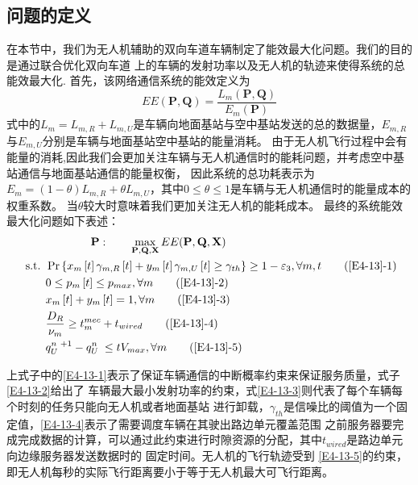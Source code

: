 \subsection{问题的定义}\label{section4-2-3}
在本节中，我们为无人机辅助的双向车道车辆制定了能效最大化问题。我们的目的是通过联合优化双向车道
上的车辆的发射功率以及无人机的轨迹来使得系统的总能效最大化.
首先，该网络通信系统的能效定义为
\begin{equation} \label{E4-12}
EE(\mathbf{P}, \mathbf{Q})=
{\frac{{{L}_{m}}\left( \mathbf{P}, \mathbf{Q} \right)}
{{{E}_{m}}\left( \mathbf{P} \right)}}
\end{equation}
式中的${{L}_{m}={L}_{m,R}+{L}_{m,U}}$是车辆向地面基站与空中基站发送的总的数据量，${E}_{m,R}$与${E}_{m,U}$分别是车辆与地面基站空中基站的能量消耗。
由于无人机飞行过程中会有能量的消耗,因此我们会更加关注车辆与无人机通信时的能耗问题，并考虑空中基站通信与地面基站通信的能量权衡，
因此系统的总功耗表示为${{E}_{m}=(1-\theta){L}_{m,R}+\theta{L}_{m,U}}$，其中$0\le \theta \le 1$是车辆与无人机通信时的能量成本的权重系数。
当$\theta$较大时意味着我们更加关注无人机的能耗成本。
最终的系统能效最大化问题如下表述：
\begin{align}
& \qquad\qquad\textbf{P}:\qquad \max_{ \mathbf{P}, \mathbf{Q}, \mathbf{X} }  EE(\mathbf{P}, \mathbf{Q}, \mathbf{X})                \label{E4-13}\\
\text { s.t. }
& \Pr\left\{x_m\left[t\right]\gamma_{m,R}\left[t\right]+y_m\left[t\right]\gamma_{m,U}\left[t\right]\geq \gamma_{th}\right\}\geq1-\varepsilon_3, \forall m,t   \tag{\ref{E4-13}{-1}}      \label{E4-13-1}\\  %
& 0\le p_m\left[t\right]\le p_{max}, \forall m                           \tag{\ref{E4-13}{-2}}      \label{E4-13-2}\\  %
& x_m\left[t\right] + y_m\left[t\right]=1, \forall m                     \tag{\ref{E4-13}{-3}}      \label{E4-13-3}\\  %
& \frac{D_R}{\nu_m} \geq t_{m}^{mec}+t_{wired}                           \tag{\ref{E4-13}{-4}}      \label{E4-13-4}\\  %
& q_U^{n\mathrm{\ }+1}-q_U^{n\mathrm{\ }}\le tV_{max}, \forall m         \tag{\ref{E4-13}{-5}}      \label{E4-13-5}    %
\end{align}

上式子中的\eqref{E4-13-1}表示了保证车辆通信的中断概率约束来保证服务质量，式子\eqref{E4-13-2}给出了
车辆最大最小发射功率的约束，式\eqref{E4-13-3}则代表了每个车辆每个时刻的任务只能向无人机或者地面基站
进行卸载，$\gamma_{th}$是信噪比的阈值为一个固定值，\eqref{E4-13-4}表示了需要调度车辆在其驶出路边单元覆盖范围
之前服务器要完成完成数据的计算，可以通过此约束进行时隙资源的分配，其中$t_{wired}$是路边单元向边缘服务器发送数据时的
固定时间。无人机的飞行轨迹受到 \eqref{E4-13-5}的约束，即无人机每秒的实际飞行距离要小于等于无人机最大可飞行距离。


